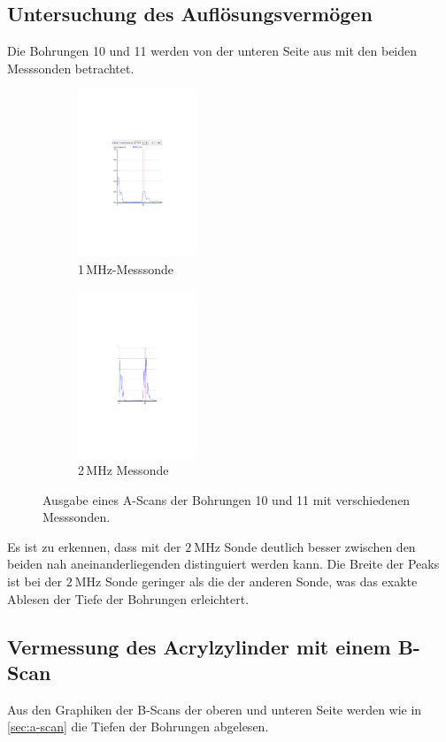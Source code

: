 \subsection{Untersuchung des Auflösungsvermögen}
\label{sec:Untersuchung des Auflösungsvermögen}
Die Bohrungen 10 und 11 werden von der unteren Seite aus mit den beiden Messsonden betrachtet.
\begin{figure}
    \begin{subfigure}{0.48\textwidth}
      \centering
      \includegraphics[height=5cm]{content/pics/1MHz.pdf}
      \caption{1\,MHz-Messsonde}
      \label{fig:1MHz}
    \end{subfigure}
    \hfill
    \begin{subfigure}{0.48\textwidth}
      \centering
      \includegraphics[height=5cm]{content/pics/2MHz.pdf}
      \caption{2\,MHz Messonde}
      \label{fig:2MHz}
    \end{subfigure}
    \caption{Ausgabe eines A-Scans der Bohrungen 10 und 11 mit verschiedenen Messsonden.}
    \label{fig:Auflösung}
  \end{figure}
Es ist zu erkennen, dass mit der $\qty{2}{\mega\hertz}$ Sonde deutlich besser zwischen den beiden nah aneinanderliegenden distinguiert 
werden kann. Die Breite der Peaks ist bei der $\qty{2}{\mega\hertz}$ Sonde geringer als die der anderen Sonde, was das exakte Ablesen der
Tiefe der Bohrungen erleichtert.

\subsection{Vermessung des Acrylzylinder mit einem B-Scan}
Aus den Graphiken der B-Scans der oberen und unteren Seite werden wie in \ref{sec:a-scan} die Tiefen der Bohrungen abgelesen.

